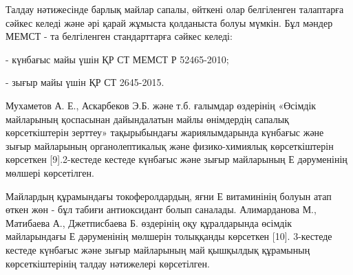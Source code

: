 \begin{multicols}{2}
Талдау нәтижесінде барлық майлар сапалы, өйткені олар белгіленген
талаптарға сәйкес келеді және әрі қарай жұмыста қолданыста болуы мүмкін.
Бұл мәндер МЕМСТ - та белгіленген стандарттарға сәйкес келеді:

- күнбағыс майы үшін ҚР СТ МЕМСТ Р 52465-2010;

- зығыр майы үшін ҚР СТ 2645-2015.

Мухаметов А. Е., Аскарбеков Э.Б. және т.б. ғалымдар өздерінің «Өсімдік
майларының қоспасынан дайындалатын майлы өнімдердің сапалық
көрсеткіштерін зерттеу» тақырыбындағы жариялымдарында күнбағыс және
зығыр майларының органолептикалық және физико-химиялық көрсеткіштерін
көрсеткен {[}9{]}.2-кестеде кестеде күнбағыс және зығыр майларының Е
дәруменінің мөлшері көрсетілген.

Майлардың құрамындағы токоферолдардың, яғни Е витаминінің болуын атап
өткен жөн - бұл табиғи антиоксидант болып саналады. Алимарданова М.,
Матибаева А., Джетписбаева Б. өздерінің оқу құралдарында өсімдік
майларындағы Е дәруменінің мөлшерін толыққанды көрсеткен {[}10{]}.
3-кестеде кестеде күнбағыс және зығыр майларының май қышқылдық құрамының
көрсеткіштерінің талдау нәтижелері көрсетілген.
\end{multicols}

